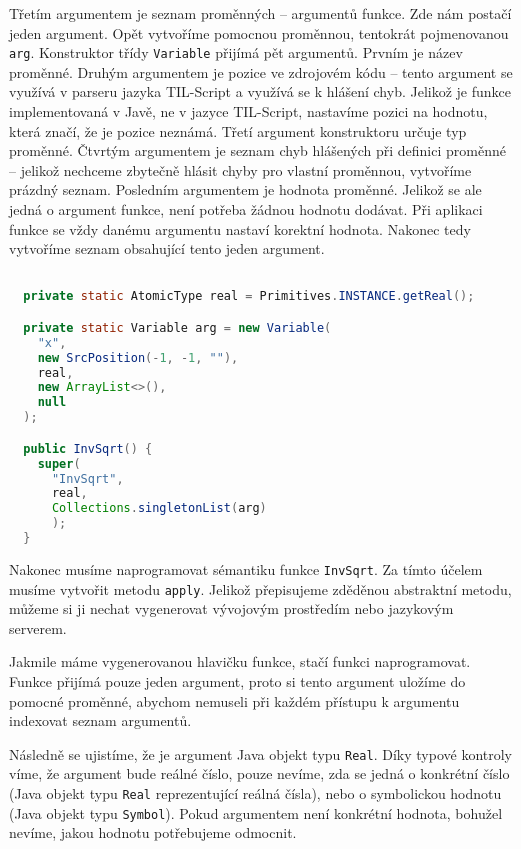 Třetím argumentem je seznam proměnných -- argumentů funkce. Zde nám postačí jeden argument. Opět
vytvoříme pomocnou proměnnou, tentokrát pojmenovanou \lstinline{arg}. Konstruktor třídy
\lstinline{Variable} přijímá pět argumentů. Prvním je název proměnné. Druhým argumentem je pozice
ve zdrojovém kódu -- tento argument se využívá v parseru jazyka TIL-Script a využívá se k hlášení
chyb. Jelikož je funkce implementovaná v Javě, ne v jazyce TIL-Script, nastavíme pozici na hodnotu,
která značí, že je pozice neznámá. Třetí argument konstruktoru určuje typ proměnné. Čtvrtým
argumentem je seznam chyb hlášených při definici proměnné -- jelikož nechceme zbytečně hlásit chyby
pro vlastní proměnnou, vytvoříme prázdný seznam. Posledním argumentem je hodnota proměnné. Jelikož
se ale jedná o argument funkce, není potřeba žádnou hodnotu dodávat. Při aplikaci funkce se vždy
danému argumentu nastaví korektní hodnota. Nakonec tedy vytvoříme seznam obsahující tento jeden
argument.

\begin{lstlisting}[caption={Konstruktor InvSqrt}, language=Java]

  private static AtomicType real = Primitives.INSTANCE.getReal();

  private static Variable arg = new Variable(
    "x",
    new SrcPosition(-1, -1, ""),
    real,
    new ArrayList<>(),
    null
  );

  public InvSqrt() {
    super(
      "InvSqrt",
      real,
      Collections.singletonList(arg)
      );
  }
\end{lstlisting}

Nakonec musíme naprogramovat sémantiku funkce \lstinline{InvSqrt}. Za tímto účelem musíme vytvořit
metodu \lstinline{apply}. Jelikož přepisujeme zděděnou abstraktní metodu, můžeme si ji nechat
vygenerovat vývojovým prostředím nebo jazykovým serverem.

Jakmile máme vygenerovanou hlavičku funkce, stačí funkci naprogramovat. Funkce přijímá pouze jeden
argument, proto si tento argument uložíme do pomocné proměnné, abychom nemuseli při každém
přístupu k argumentu indexovat seznam argumentů.

Následně se ujistíme, že je argument Java objekt typu \lstinline{Real}. Díky typové kontroly víme,
že argument bude reálné číslo, pouze nevíme, zda se jedná o konkrétní číslo (Java objekt typu
\lstinline{Real} reprezentující reálná čísla), nebo o symbolickou hodnotu (Java objekt typu
\lstinline{Symbol}). Pokud argumentem není konkrétní hodnota, bohužel nevíme, jakou hodnotu
potřebujeme odmocnit.

